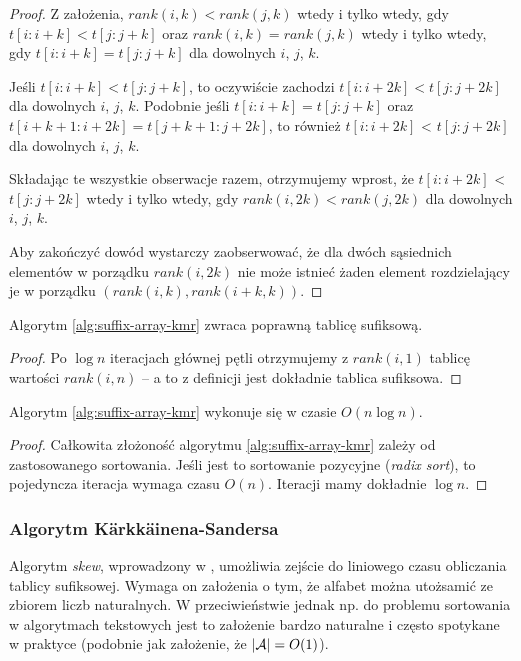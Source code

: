 \begin{proof}
  Z założenia, $rank(i, k) < rank(j, k)$ wtedy i tylko wtedy, gdy $t[i: i + k] < t[j: j + k]$ oraz $rank(i, k) = rank(j, k)$ wtedy i tylko wtedy, gdy $t[i: i + k] = t[j: j + k]$ dla dowolnych $i$, $j$, $k$.

  Jeśli $t[i: i + k] < t[j: j + k]$, to oczywiście zachodzi $t[i: i + 2 k] < t[j: j + 2 k]$ dla dowolnych $i$, $j$, $k$.
  Podobnie jeśli $t[i: i + k] = t[j: j + k]$ oraz $t[i + k + 1: i + 2 k] = t[j + k + 1: j + 2 k]$, to również $t[i: i + 2 k]$ < $t[j: j + 2 k]$ dla dowolnych $i$, $j$, $k$.

  Składając te wszystkie obserwacje razem, otrzymujemy wprost, że $t[i: i + 2 k]$ < $t[j: j + 2 k]$ wtedy i tylko wtedy, gdy $rank(i, 2 k) < rank(j, 2 k)$ dla dowolnych $i$, $j$, $k$.

  Aby zakończyć dowód wystarczy zaobserwować, że dla dwóch sąsiednich elementów w porządku $rank(i, 2 k)$ nie może istnieć żaden element rozdzielający je w porządku $(rank(i, k), rank(i + k, k))$.
\end{proof}

\begin{corollary}{}{}
  Algorytm \ref{alg:suffix-array-kmr} zwraca poprawną tablicę sufiksową.
\end{corollary}

\begin{proof}
  Po $\log{n}$ iteracjach głównej pętli otrzymujemy z $rank(i, 1)$ tablicę wartości $rank(i, n)$ -- a to z definicji jest dokładnie tablica sufiksowa.
\end{proof}

\begin{theorem}{}{}
  Algorytm \ref{alg:suffix-array-kmr} wykonuje się w czasie $O(n \log{n})$.
\end{theorem}

\begin{proof}
  Całkowita złożoność algorytmu \ref{alg:suffix-array-kmr} zależy od zastosowanego sortowania.
  Jeśli jest to sortowanie pozycyjne (\emph{radix sort}), to pojedyncza iteracja wymaga czasu $O(n)$. Iteracji mamy dokładnie $\log{n}$.
\end{proof}

\subsubsection{Algorytm K\"arkk\"ainena-Sandersa}

Algorytm \emph{skew}, wprowadzony w \citep{karkkainen2003simple}, umożliwia zejście do liniowego czasu obliczania tablicy sufiksowej.
Wymaga on założenia o tym, że alfabet można utożsamić ze zbiorem liczb naturalnych. W przeciwieństwie jednak np. do problemu sortowania w algorytmach tekstowych jest to założenie bardzo naturalne i często spotykane w praktyce (podobnie jak założenie, że $|\mathcal{A}| = O(1)$).

